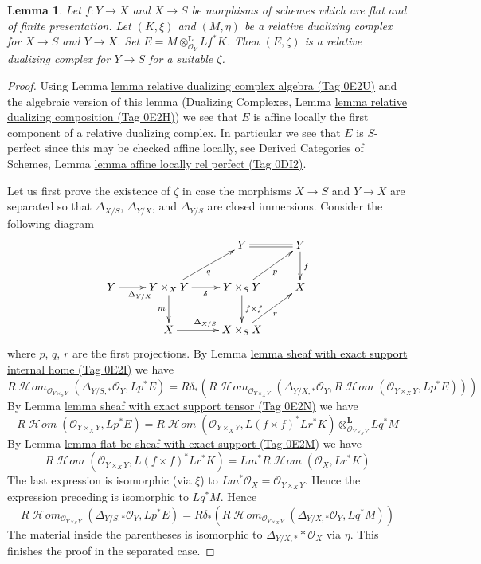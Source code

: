 \documentclass{amsart}
\theoremstyle{plain}
\newtheorem{lemma}[subsection]{Lemma}
\theoremstyle{definition}
\theoremstyle{remark}
\numberwithin{equation}{subsection}
\def\SheafHom{\mathop{\mathcal{H}\!\mathit{om}}\nolimits}
\begin{document}
\begin{lemma}
\label{lemma-relative-dualizing-composition}
Let $f : Y \to X$ and $X \to S$ be morphisms of schemes
which are flat and of finite presentation.
Let $(K, \xi)$ and $(M, \eta)$
be a relative dualizing complex for $X \to S$ and $Y \to X$.
Set $E = M \otimes_{\mathcal{O}_Y}^\mathbf{L} Lf^*K$.
Then $(E, \zeta)$ is a relative dualizing complex for $Y \to S$ for
a suitable $\zeta$.
\end{lemma}

\begin{proof}
Using Lemma \href{https://stacks.math.columbia.edu/tag/0E2U}{lemma relative dualizing complex algebra (Tag 0E2U)}
and the algebraic version of this lemma (Dualizing Complexes, Lemma
\href{https://stacks.math.columbia.edu/tag/0E2H}{lemma relative dualizing composition (Tag 0E2H)})
we see that $E$
is affine locally the first component of a relative dualizing complex.
In particular we see that $E$
is $S$-perfect since this may be checked affine locally, see
Derived Categories of Schemes, Lemma
\href{https://stacks.math.columbia.edu/tag/0DI2}{lemma affine locally rel perfect (Tag 0DI2)}.

\medskip\noindent
Let us first prove the existence of $\zeta$ in case the
morphisms $X \to S$ and $Y \to X$ are separated so that
$\Delta_{X/S}$, $\Delta_{Y/X}$, and $\Delta_{Y/S}$
are closed immersions. Consider the following diagram
$$
\xymatrix{
& & Y \ar@{=}[r] & Y \ar[d]^f \\
Y \ar[r]_{\Delta_{Y/X}} &
Y \times_X Y \ar[d]_m \ar[r]_\delta \ar[ru]_q &
Y \times_S Y \ar[d]^{f \times f} \ar[ru]_p & X\\
& X \ar[r]^{\Delta_{X/S}} & X \times_S X \ar[ru]_r
}
$$
where $p$, $q$, $r$ are the first projections.
By Lemma \href{https://stacks.math.columbia.edu/tag/0E2I}{lemma sheaf with exact support internal home (Tag 0E2I)}
we have
$$
R\SheafHom_{\mathcal{O}_{Y \times_S Y}}(
\Delta_{Y/S, *}\mathcal{O}_Y, Lp^*E) =
R\delta_*\left(R\SheafHom_{\mathcal{O}_{Y \times_X Y}}(
\Delta_{Y/X, *}\mathcal{O}_Y,
R\SheafHom(\mathcal{O}_{Y \times_X Y}, Lp^*E))\right)
$$
By Lemma \href{https://stacks.math.columbia.edu/tag/0E2N}{lemma sheaf with exact support tensor (Tag 0E2N)} we have
$$
R\SheafHom(\mathcal{O}_{Y \times_X Y}, Lp^*E) =
R\SheafHom(\mathcal{O}_{Y \times_X Y}, L(f \times f)^*Lr^*K)
\otimes_{\mathcal{O}_{Y \times_S Y}}^\mathbf{L} Lq^*M
$$
By Lemma \href{https://stacks.math.columbia.edu/tag/0E2M}{lemma flat bc sheaf with exact support (Tag 0E2M)} we have
$$
R\SheafHom(\mathcal{O}_{Y \times_X Y}, L(f \times f)^*Lr^*K) =
Lm^*R\SheafHom(\mathcal{O}_X, Lr^*K)
$$
The last expression is isomorphic (via $\xi$) to
$Lm^*\mathcal{O}_X = \mathcal{O}_{Y \times_X Y}$.
Hence the expression preceding is isomorphic to
$Lq^*M$. Hence
$$
R\SheafHom_{\mathcal{O}_{Y \times_S Y}}(
\Delta_{Y/S, *}\mathcal{O}_Y, Lp^*E) =
R\delta_*\left(R\SheafHom_{\mathcal{O}_{Y \times_X Y}}(
\Delta_{Y/X, *}\mathcal{O}_Y, Lq^*M)\right)
$$
The material inside the parentheses is isomorphic to
$\Delta_{Y/X, *}*\mathcal{O}_X$ via $\eta$.
This finishes the proof in the separated case.


\end{proof}
\end{document}
